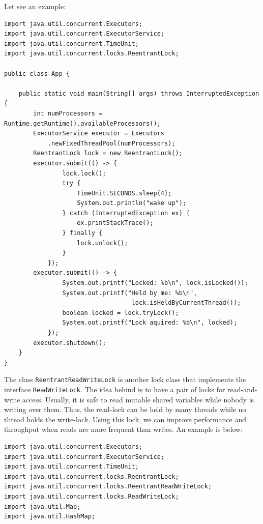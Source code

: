 \documentclass{latex/classes/thesis}
\begin{document}
\begin{enumerate}
Let see an example:

\begin{lstlisting}
import java.util.concurrent.Executors;
import java.util.concurrent.ExecutorService;
import java.util.concurrent.TimeUnit;
import java.util.concurrent.locks.ReentrantLock;

public class App {

    public static void main(String[] args) throws InterruptedException {
        int numProcessors = Runtime.getRuntime().availableProcessors();
        ExecutorService executor = Executors
            .newFixedThreadPool(numProcessors);
        ReentrantLock lock = new ReentrantLock();
        executor.submit(() -> {
                lock.lock();
                try {
                    TimeUnit.SECONDS.sleep(4);
                    System.out.println("wake up");
                } catch (InterruptedException ex) {
                    ex.printStackTrace();
                } finally {
                    lock.unlock();
                }
            });
        executor.submit(() -> {
                System.out.printf("Locked: %b\n", lock.isLocked());
                System.out.printf("Held by me: %b\n",
                                   lock.isHeldByCurrentThread());
                boolean locked = lock.tryLock();
                System.out.printf("Lock aquired: %b\n", locked);
            });
        executor.shutdown();
    }
}
\end{lstlisting}

The class \texttt{ReentrantReadWriteLock} is another lock class that implements the
interface \texttt{ReadWriteLock}.  The idea behind is to have a pair of locks for
read-and-write access. Usually, it is safe to read mutable shared variables
while nobody is writing over them. Thus, the read-lock can be held by many
threads while no thread holds the write-lock. Using this lock, we can
improve performance and throughput when reads are more frequent than
writes. An example is below:

\begin{lstlisting}
import java.util.concurrent.Executors;
import java.util.concurrent.ExecutorService;
import java.util.concurrent.TimeUnit;
import java.util.concurrent.locks.ReentrantLock;
import java.util.concurrent.locks.ReentrantReadWriteLock;
import java.util.concurrent.locks.ReadWriteLock;
import java.util.Map;
import java.util.HashMap;


\end{lstlisting}
\end{enumerate}
\end{document}
